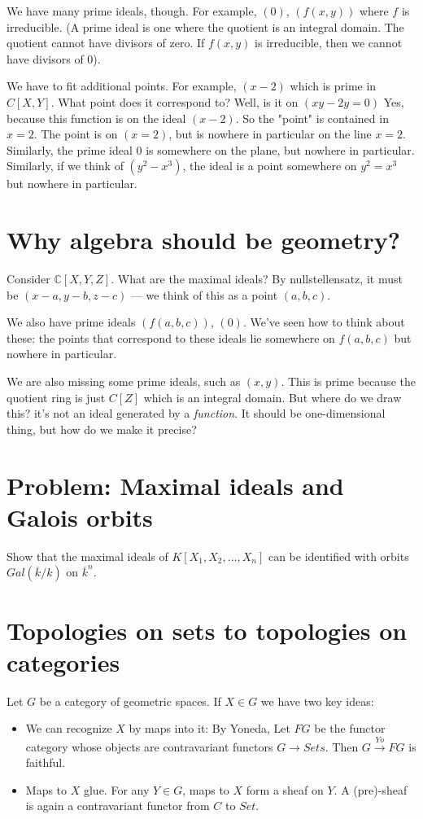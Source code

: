 \documentclass{book}
\newcommand{\C}{\ensuremath{\mathbb{C}}}
\theoremstyle{definition}
\begin{document}
We have many prime ideals, though. For example, $(0)$, $(f(x, y))$ where $f$ is irreducible.
(A prime ideal is one where the quotient is an integral domain. The quotient
cannot have divisors of zero. If $f(x, y)$ is irreducible, then we cannot have divisors of $0$).

We have to fit additional points. For example, $(x-2)$ which is prime in $C[X, Y]$.
What point does it correspond to? Well, is it on $(xy - 2y = 0)$ Yes, because
this function is on the ideal $(x-2)$. So the "point" is contained in $x = 2$.
The point is on $(x=2)$, but is nowhere in particular on the line $x=2$.
Similarly, the prime ideal $0$ is somewhere on the plane, but nowhere in particular.
Similarly, if we think of $(y^2 - x^3)$, the ideal is a point somewhere on $y^2 = x^3$
but nowhere in particular.

\section{Why algebra should be geometry?}

Consider $\C[X, Y, Z]$. What are the maximal ideals? By nullstellensatz, it must be $(x-a, y-b, z-c)$ --- we think
of this as a point $(a, b, c)$.



We also have prime ideals $(f(a, b, c))$, $(0)$. We've seen how to think about these:
the points that correspond to these ideals lie somewhere on $f(a, b, c)$ but
nowhere in particular.

We are also missing some prime ideals,
such as $(x, y)$. This is prime because the quotient ring is just $C[Z]$ which is
an integral domain. But where do we draw this? it's not an ideal generated by a \emph{function}.
It should be one-dimensional thing, but how do we make it precise?

\section{Problem: Maximal ideals and Galois orbits}

Show that the maximal ideals of $K[X_1, X_2, \dots, X_n]$ can be identified with
orbits $Gal(\overline{k}/k)$ on $\overline{k}^n$.

\section{Topologies on sets to topologies on categories}

Let $G$ be a category of geometric spaces. If $X \in G$ we have two key ideas:
\begin{itemize}
        \item We can recognize $X$ by maps into it: By Yoneda, Let $FG$
             be the functor category whose objects are contravariant functors
             $G \rightarrow Sets$. Then $G \xrightarrow{Yo} FG$ is faithful.
         \item Maps to $X$ glue. For any $Y \in G$, maps to $X$ form a sheaf on $Y$.
             A (pre)-sheaf is again a contravariant functor from $C$ to $Set$.
\end{itemize}
\end{document}
